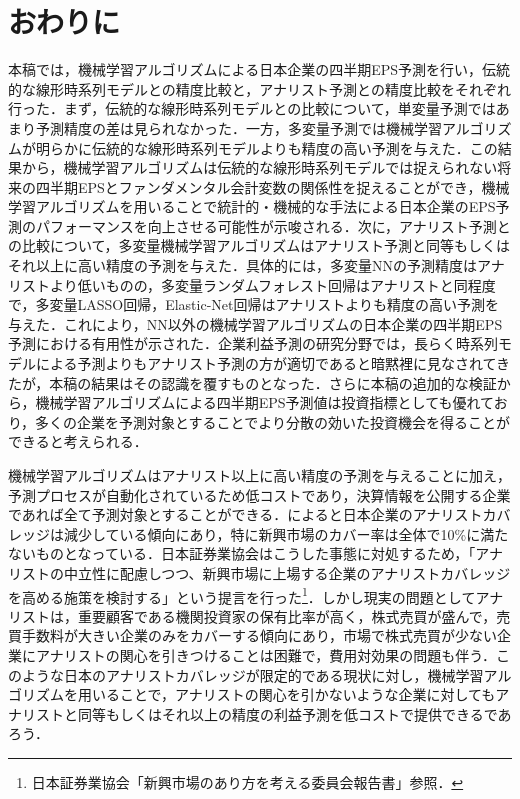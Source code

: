 \documentclass[a4paper，11pt]{jsarticle}
\begin{document}
\part{おわりに} \label{par:conclusion}

本稿では，機械学習アルゴリズムによる日本企業の四半期EPS予測を行い，伝統的な線形時系列モデルとの精度比較と，アナリスト予測との精度比較をそれぞれ行った．まず，伝統的な線形時系列モデルとの比較について，単変量予測ではあまり予測精度の差は見られなかった．一方，多変量予測では機械学習アルゴリズムが明らかに伝統的な線形時系列モデルよりも精度の高い予測を与えた．この結果から，機械学習アルゴリズムは伝統的な線形時系列モデルでは捉えられない将来の四半期EPSとファンダメンタル会計変数の関係性を捉えることができ，機械学習アルゴリズムを用いることで統計的・機械的な手法による日本企業のEPS予測のパフォーマンスを向上させる可能性が示唆される．次に，アナリスト予測との比較について，多変量機械学習アルゴリズムはアナリスト予測と同等もしくはそれ以上に高い精度の予測を与えた．具体的には，多変量NNの予測精度はアナリストより低いものの，多変量ランダムフォレスト回帰はアナリストと同程度で，多変量LASSO回帰，Elastic-Net回帰はアナリストよりも精度の高い予測を与えた．これにより，NN以外の機械学習アルゴリズムの日本企業の四半期EPS予測における有用性が示された．企業利益予測の研究分野では，長らく時系列モデルによる予測よりもアナリスト予測の方が適切であると暗黙裡に見なされてきたが，本稿の結果はその認識を覆すものとなった．さらに本稿の追加的な検証から，機械学習アルゴリズムによる四半期EPS予測値は投資指標としても優れており，多くの企業を予測対象とすることでより分散の効いた投資機会を得ることができると考えられる．

機械学習アルゴリズムはアナリスト以上に高い精度の予測を与えることに加え，予測プロセスが自動化されているため低コストであり，決算情報を公開する企業であれば全て予測対象とすることができる．\cite{yoneyama2010}によると日本企業のアナリストカバレッジは減少している傾向にあり，特に新興市場のカバー率は全体で10\%に満たないものとなっている．日本証券業協会はこうした事態に対処するため，「アナリストの中立性に配慮しつつ、新興市場に上場する企業のアナリストカバレッジを高める施策を検討する」という提言を行った\footnote{日本証券業協会「新興市場のあり方を考える委員会報告書」参照．}．しかし現実の問題としてアナリストは，重要顧客である機関投資家の保有比率が高く，株式売買が盛んで，売買手数料が大きい企業のみをカバーする傾向にあり\citep{nakai2006}，市場で株式売買が少ない企業にアナリストの関心を引きつけることは困難で，費用対効果の問題も伴う．このような日本のアナリストカバレッジが限定的である現状に対し，機械学習アルゴリズムを用いることで，アナリストの関心を引かないような企業に対してもアナリストと同等もしくはそれ以上の精度の利益予測を低コストで提供できるであろう．
\end{document}

